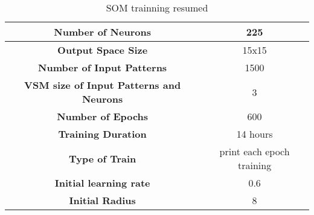 \begin{table}[H]
  \caption{SOM trainning resumed}
  \label{tab:som_colours}
  \begin{center}
    \begin{tabular}{|c|c|}
      \hline
      \textbf{Number of Neurons} & 225 \\
      \hline
      \textbf{Output Space Size} & 15x15 \\
      \hline
      \textbf{Number of Input Patterns} & 1500 \\
      \hline
      \textbf{VSM size of Input Patterns and Neurons} & 3 \\
      \hline
      \textbf{Number of Epochs} & 600 \\
      \hline
      \textbf{Training Duration} & 14 hours \\
      \hline
      \textbf{Type of Train} & print each epoch training\\
      \hline
      \textbf{Initial learning rate} & 0.6\\
      \hline
      \textbf{Initial Radius} & 8\\
      \hline
    \end{tabular}
  \end{center}
\end{table}
